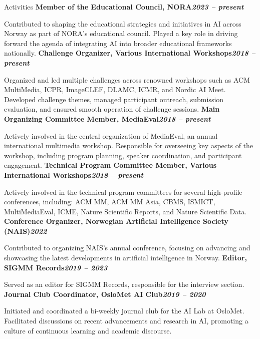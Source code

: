 \begin{rubric}{Activities}
\entry*[]%
\textbf{Member of the Educational Council, NORA\hfill\textit{2023 -- present}} \par 
Contributed to shaping the educational strategies and initiatives in AI across Norway as part of NORA's educational council. Played a key role in driving forward the agenda of integrating AI into broader educational frameworks nationally.
% 
\entry*[]%
\textbf{Challenge Organizer, Various International Workshops\hfill\textit{2018 -- present}} \par
Organized and led multiple challenges across renowned workshops such as ACM MultiMedia, ICPR, ImageCLEF, DLAMC, ICMR, and Nordic AI Meet. Developed challenge themes, managed participant outreach, submission evaluation, and ensured smooth operation of challenge sessions.
%
\entry*[]%
\textbf{Main Organizing Committee Member, MediaEval\hfill\textit{2018 -- present}} \par
Actively involved in the central organization of MediaEval, an annual international multimedia workshop. Responsible for overseeing key aspects of the workshop, including program planning, speaker coordination, and participant engagement.
% 
\entry*[]%
\textbf{Technical Program Committee Member, Various International Workshops\hfill\textit{2018 -- present}} \par
Actively involved in the technical program committees for several high-profile conferences, including: ACM MM, ACM MM Asia, CBMS, ISMICT, MultiMediaEval, ICME, Nature Scientific Reports, and Nature Scientific Data.
%
\entry*[]%
\textbf{Conference Organizer, Norwegian Artificial Intelligence Society (NAIS)\hfill\textit{2022}} \par
Contributed to organizing NAIS's annual conference, focusing on advancing and showcasing the latest developments in artificial intelligence in Norway.
%
\entry*[]%
\textbf{Editor, SIGMM Records\hfill\textit{2019 -- 2023}} \par
Served as an editor for SIGMM Records, responsible for the interview section.
%
\entry*[]%
\textbf{Journal Club Coordinator, OsloMet AI Club\hfill\textit{2019 -- 2020}} \par
Initiated and coordinated a bi-weekly journal club for the AI Lab at OsloMet. Facilitated discussions on recent advancements and research in AI, promoting a culture of continuous learning and academic discourse.
\end{rubric}
